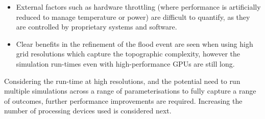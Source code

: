 \begin{itemize}
	\item External factors such as hardware throttling (where performance is artificially reduced to manage temperature or power) are difficult to quantify, as they are controlled by proprietary systems and software.
	\item Clear benefits in the refinement of the flood event are seen when using high grid resolutions which capture the topographic complexity, however the simulation run-times even with high-performance GPUs are still long.
\end{itemize}

Considering the run-time at high resolutions, and the potential need to run multiple simulations across a range of parameterisations to fully capture a range of outcomes, further performance improvements are required. Increasing the number of processing devices used is considered next.
